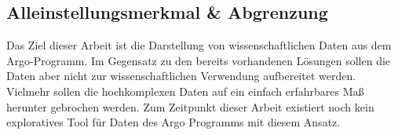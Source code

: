     
\subsection{Alleinstellungsmerkmal \& Abgrenzung}
    
    Das Ziel dieser Arbeit ist die Darstellung von wissenschaftlichen Daten aus dem Argo-Programm. Im Gegensatz zu den bereits vorhandenen Lösungen sollen die Daten aber nicht zur wissenschaftlichen Verwendung aufbereitet werden. Vielmehr sollen die hochkomplexen Daten auf ein einfach erfahrbares Maß herunter gebrochen werden. Zum Zeitpunkt dieser Arbeit existiert noch kein exploratives Tool für Daten des Argo Programms mit diesem Ansatz.
    

